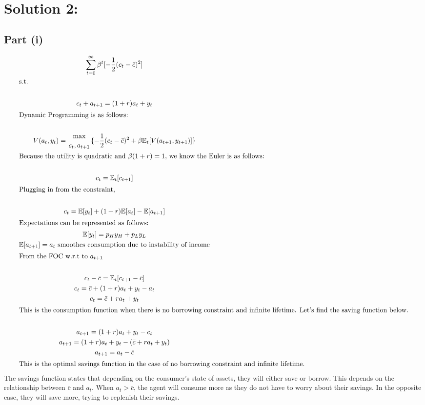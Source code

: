 \documentclass[10pt,a4paper]{article}
\begin{document}
\section*{Solution 2:} 
  \subsection{Part (i)}
    \begin{gather*}
      \sum\limits_{t=0}^{\infty}\beta^t[-\frac{1}{2}(c_t -
      \bar{c})^2] \\
      \shortintertext{s.t.} \\
      c_t + a_{t+1} = (1+r)a_t + y_t \\
      \shortintertext{Dynamic Programming is as follows:} \\
      V(a_t,y_t) = {\max\atop{c_t,a_{t+1}}}\{-\frac{1}{2}(c_t - \bar{c})^2 + \beta\mathbb{E}_t[V(a_{t+1},y_{t+1})]\} \\
      \shortintertext{Because the utility is quadratic and $\beta(1+r) = 1$, we know the Euler is as follows:} \\
      c_t = \mathbb{E}_t[c_{t+1}] \\
      \shortintertext{Plugging in from the constraint,} \\
      c_t = \mathbb{E}[y_t] + (1+r)\mathbb{E}[a_t] - \mathbb{E}[a_{t+1}] \\
      \shortintertext{Expectations can be represented as follows:}
      \mathbb{E}[y_t] = p_Hy_H + p_Ly_L \\
      \mathbb{E}[a_{t+1}] = a_t \ \text{smoothes consumption due to instability of income} \\
      \shortintertext{From the FOC w.r.t to $a_{t+1}$} \\
      c_t - \bar{c} = \mathbb{E}_t[c_{t+1}-\bar{c}] \\
      c_t = \bar{c} + (1+r)a_t + y_t - a_t \\
      c_t = \bar{c} + ra_t + y_t \\
      \shortintertext{This is the consumption function when there is no borrowing constraint and infinite lifetime. Let's find the saving function below.} \\
      a_{t+1} = (1+r)a_t + y_t - c_t \\
      a_{t+1} = (1+r)a_t + y_t - (\bar{c}+ra_t+y_t) \\
      a_{t+1} = a_t - \bar{c} \\
      \shortintertext{This is the optimal savings function in the case of no borrowing constraint and infinite lifetime.}
    \end{gather*}
    The savings function states that depending on the consumer's state of assets, they will either save or borrow. This depends on the relationship between $\bar{c}$ and $a_t$. When $a_t>\bar{c}$, the agent will consume more as they do not have to worry about their savings. In the opposite case, they will save more, trying to replenish their savings.
\end{document}
